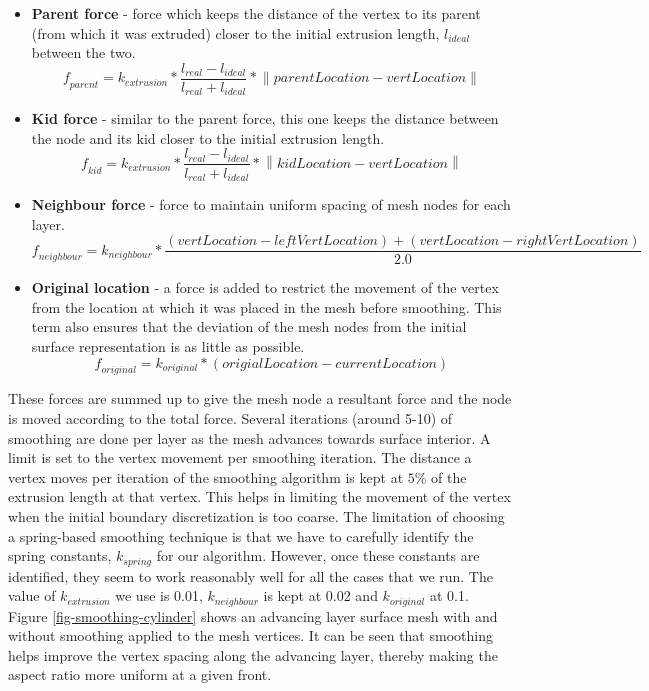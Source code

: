 \documentclass[conf]{new-aiaa}
\newcommand{\norm}[1]{\left\lVert#1\right\rVert}
\begin{document}
\begin{itemize}
\item \textbf{Parent force} - force which keeps the distance of the vertex to its parent (from which it was extruded) closer to the initial extrusion length, $\mathit{l_{ideal}}$ between the two.
\begin{equation}
\mathit{f_{parent}} = \mathit{k_{extrusion} * \frac{l_{real} - l_{ideal}}{l_{real} + l_{ideal}} * \norm{parentLocation - \mathit{vertLocation}}}
\end{equation}
\item \textbf{Kid force} - similar to the parent force, this one keeps the distance between the node and its kid closer to the initial extrusion length.
\begin{equation}
\mathit{f_{kid} = k_{extrusion} * \frac{l_{real} - l_{ideal}}{l_{real} + l_{ideal}} * \norm{kidLocation - vertLocation}}
\end{equation}
\item \textbf{Neighbour force} - force to maintain uniform spacing of mesh nodes for each layer.
\begin{equation}
\mathit{f_{neighbour} = k_{neighbour} * \frac{(vertLocation - leftVertLocation) + (vertLocation - rightVertLocation)}{ 2.0}}
\end{equation}
\item \textbf{Original location} - a force is added to restrict the movement of the vertex from the location at which it was placed in the mesh before smoothing. This term also ensures that the deviation of the mesh nodes from the initial surface representation is as little as possible.
\begin{equation}
\mathit{f_{original} = k_{original} * (origialLocation - currentLocation)}
\end{equation}
\end{itemize}

These forces are summed up to give the mesh node a resultant force and the node is moved according to the total force. Several iterations (around 5-10) of smoothing are done per layer as the mesh advances towards surface interior. A limit is set to the vertex movement per smoothing iteration. The distance a vertex moves per iteration of the smoothing algorithm is kept at $5\%$ of the extrusion length at that vertex. This helps in limiting the movement of the vertex when the initial boundary discretization is too coarse. The limitation of choosing a spring-based smoothing technique is that we have to carefully identify the spring constants, $\mathit{k_{spring}}$ for our algorithm. However, once these constants are identified, they seem to work reasonably well for all the cases that we run. The value of $\mathit{k_{extrusion}}$ we use is 0.01, $k_{neighbour}$ is kept at 0.02 and $\mathit{k_{original}}$ at 0.1. Figure \ref{fig-smoothing-cylinder} shows an advancing layer surface mesh with and without smoothing applied to the mesh vertices. It can be seen that smoothing helps improve the vertex spacing along the advancing layer, thereby making the aspect ratio more uniform at a given front.
\end{document}
